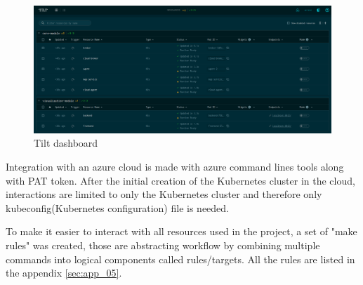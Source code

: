 \begin{figure}[H]
    \centering
    \includegraphics[width=\textwidth]{pictures/tilt.png}
    \caption{ Tilt dashboard}
    \label{fig:tilt}
\end{figure}

Integration with an azure cloud is made with azure command lines tools along with PAT token. After the initial creation of the Kubernetes cluster in the cloud, interactions are limited to only the Kubernetes cluster and therefore only kubeconfig(Kubernetes configuration) file is needed.

To make it easier to interact with all resources used in the project, a set of "make rules" was created, those are abstracting workflow by combining multiple commands into logical components called rules/targets. All the rules are listed in the appendix \ref{sec:app_05}.